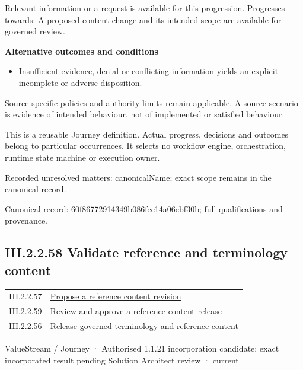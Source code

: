 Relevant information or a request is available for this progression. Progresses towards: A proposed content change and its intended scope are available for governed review.



\par\medskip\textbf{Alternative outcomes and conditions}\par


\begin{itemize}


\item Insufficient evidence, denial or conflicting information yields an explicit incomplete or adverse disposition.

\end{itemize}


Source-specific policies and authority limits remain applicable. A source scenario is evidence of intended behaviour, not of implemented or satisfied behaviour.



This is a reusable Journey definition. Actual progress, decisions and outcomes belong to particular occurrences. It selects no workflow engine, orchestration, runtime state machine or execution owner.


{\small Recorded unresolved matters: canonicalName; exact scope remains in the canonical record.}\par
{\footnotesize \href{../../../../continuum/strategy/value-stream/60f86772914349b086fec14a06ebf30b.md}{Canonical record: 60f86772914349b086fec14a06ebf30b}; full qualifications and provenance.}\par
\subsection*{III.2.2.58 Validate reference and terminology content}
\label{navigation:III.2.2.58}

\begin{longtable}{p{.22\linewidth}p{.73\linewidth}}
III.2.2.57 & \hyperref[element:60f86772914349b086fec14a06ebf30b]{Propose a reference content revision} \\
III.2.2.59 & \hyperref[element:cdca249dbbef4d798219d4732bd8e74f]{Review and approve a reference content release} \\
III.2.2.56 & \hyperref[element:e9a8a77c5f9c4361af4dfcfa607ece2d]{Release governed terminology and reference content} \\
\end{longtable}
\label{element:6e6c29788acd49ab87f918476d7a3de0}
{\small ValueStream / Journey · Authorised 1.1.21 incorporation candidate; exact incorporated result pending Solution Architect review · current}\par

